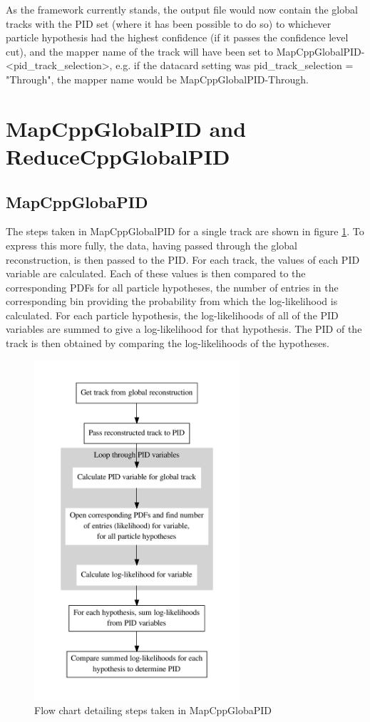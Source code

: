 As the framework currently stands, the output file would now contain the global tracks with the PID set (where it has been possible to do so) to whichever particle hypothesis had the highest confidence (if it passes the confidence level cut), and the mapper name of the track will have been set to MapCppGlobalPID-<pid\_track\_selection>, e.g. if the datacard setting was pid\_track\_selection = "Through", the mapper name would be MapCppGlobalPID-Through.

\section{MapCppGlobalPID and ReduceCppGlobalPID}
\label{pid_mapred}
\subsection{MapCppGlobaPID}
\label{pid_map}
The steps taken in MapCppGlobalPID for a single track are shown in 
figure \ref{mapflow}. To express this more fully, the data, having passed through the global reconstruction, is then passed to the PID. For each track, the values of each PID variable are calculated. Each of these values is then compared to the corresponding PDFs for all particle hypotheses, the number of entries in the corresponding bin providing the probability from which the log-likelihood is calculated. For each particle hypothesis, the log-likelihoods of all of the PID variables are summed to give a log-likelihood for that hypothesis. The PID of the track is then obtained by comparing the log-likelihoods of the hypotheses.
\begin{figure}[h!]
\begin{center} 
\includegraphics[width=3in]{reconstruction/globalpid/PIDflow.pdf} 
\caption{Flow chart detailing steps taken in MapCppGlobaPID}
\label{mapflow}
\end{center} 
\end{figure}

